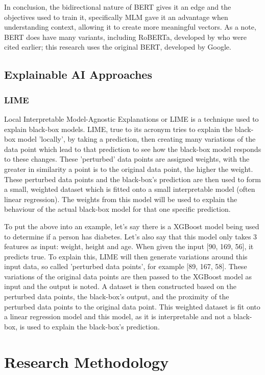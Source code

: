\documentclass[stu,12pt,floatsintext,donotrepeattitle]{apa7}
\begin{document}
In conclusion, the bidirectional nature of BERT gives it an edge and the objectives used to train it, specifically MLM gave it an advantage when understanding context, allowing it to create more meaningful vectors. As a note, BERT does have many variants, including RoBERTa, developed by \textcite{roberta} who were cited earlier; this research uses the original BERT, developed by Google. 

\subsection{Explainable AI Approaches}
\subsubsection{LIME}
Local Interpretable Model-Agnostic Explanations or LIME is a technique used to explain black-box models. LIME, true to its acronym tries to explain the black-box model 'locally', by taking a prediction, then creating many variations of the data point which lead to that prediction to see how the black-box model responds to these changes. These 'perturbed' data points are assigned weights, with the greater in similarity a point is to the original data point, the higher the weight. These perturbed data points and the black-box's prediction are then used to form a small, weighted dataset which is fitted onto a small interpretable model (often linear regression). The weights from this model will be used to explain the behaviour of the actual black-box model for that one specific prediction. 

To put the above into an example, let's say there is a XGBoost model being used to determine if a person has diabetes. Let's also say that this model only takes 3 features as input: weight, height and age. When given the input [90, 169, 56], it predicts true. To explain this, LIME will then generate variations around this input data, so called 'perturbed data points', for example [89, 167, 58]. These variations of the original data points are then passed to the XGBoost model as input and the output is noted. A dataset is then constructed based on the perturbed data points, the black-box's output, and the proximity of the perturbed data points to the original data point. This weighted dataset is fit onto a linear regression model and this model, as it is interpretable and not a black-box, is used to explain the black-box's prediction.

\clearpage
\section{Research Methodology}
\end{document}
